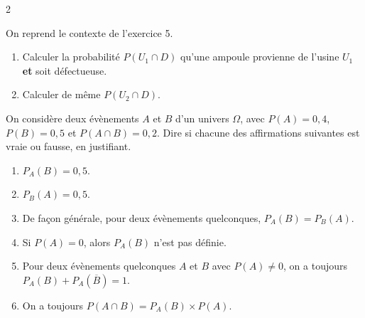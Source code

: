 \documentclass[10pt,a4paper]{article}
\begin{document}
\begin{multicols}{2}
\begin{exo}

On reprend le contexte de l'exercice 5.

\begin{enumerate}[leftmargin=*]
    \item Calculer la probabilité \(P(U_1\cap D)\) qu'une ampoule provienne de l'usine \(U_1\) \textbf{et} soit défectueuse.
    \item Calculer de même \(P(U_2\cap D)\).
\end{enumerate}
\end{exo}


\begin{exo}
On considère deux évènements \(A\) et \(B\) d'un univers \(\Omega\), avec \(P(A)=0,4\), \(P(B)=0,5\) et \(P(A\cap B)=0,2\). Dire si chacune des affirmations suivantes est vraie ou fausse, en justifiant.

\begin{enumerate}[leftmargin=*]
    \item \(P_A(B) = 0,5\).
    \item \(P_B(A) = 0,5\).
    \item De façon générale, pour deux évènements quelconques, \(P_A(B)=P_B(A)\).
    \item Si \(P(A)=0\), alors \(P_A(B)\) n'est pas définie.
    \item Pour deux évènements quelconques \(A\) et \(B\) avec \(P(A)\neq0\), on a toujours \(P_A(B)+P_A(\overline B)=1\).
    \item On a toujours \(P(A\cap B) = P_A(B)\times P(A)\).
\end{enumerate}
\end{exo}


\end{multicols}
\end{document}
